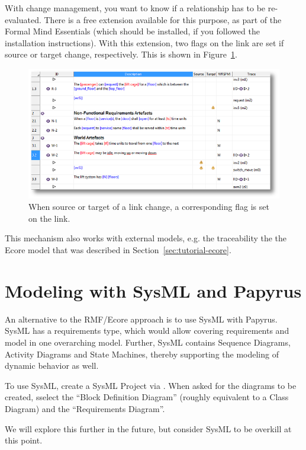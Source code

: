 With change management, you want to know if a relationship has to be re-evaluated.  There is a free extension available for this purpose, as part of the Formal Mind Essentials (which should be installed, if you followed the installation instructions).  With this extension, two flags on the link are set if source or target change, respectively.  This is shown in Figure~\ref{fig:change-mgmt}.

\begin{figure}[h!]
  \centering
  \includegraphics[width=0.8\linewidth]{../se-images/ProRArtefacts_Trace_LL.png}
  \caption{When source or target of a link change, a corresponding flag is set on the link.}
  \label{fig:change-mgmt}
\end{figure}

This mechanism also works with external models, e.g. the traceability the the Ecore model that was described in Section~\ref{sec:tutorial-ecore}.

\section{Modeling with SysML and Papyrus}

An alternative to the RMF/Ecore approach is to use SysML with Papyrus.  SysML has a requirements type, which would allow covering requirements and model in one overarching model.  Further, SysML contains Sequence Diagrams, Activity Diagrams and State Machines, thereby supporting the modeling of dynamic behavior as well.

To use SysML, create a SysML Project via . When asked for the diagrams to be created, sselect the ``Block Definition Diagram'' (roughly equivalent to a Class Diagram) and the ``Requirements Diagram''.

We will explore this further in the future, but consider SysML to be overkill at this point.

